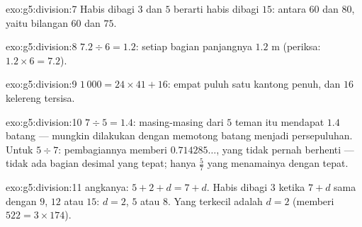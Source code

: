 \begin{solution}{exo:g5:division:7}
Habis dibagi $3$ dan $5$ berarti habis dibagi $15$: antara $60$ dan
$80$, yaitu bilangan $60$ dan $75$.
\end{solution}

\begin{solution}{exo:g5:division:8}
$7.2 \div 6 = 1.2$: setiap bagian panjangnya $1.2$ m (periksa:
$1.2 \times 6 = 7.2$).
\end{solution}

\begin{solution}{exo:g5:division:9}
$1\,000 = 24 \times 41 + 16$: empat puluh satu kantong penuh, dan
$16$ kelereng tersisa.
\end{solution}

\begin{solution}{exo:g5:division:10}
$7 \div 5 = 1.4$: masing-masing dari $5$ teman itu mendapat $1.4$
batang --- mungkin dilakukan dengan memotong batang menjadi
persepuluhan. Untuk $5 \div 7$: pembagiannya memberi $0.714285\dots$,
yang tidak pernah berhenti --- tidak ada bagian desimal yang tepat;
hanya  $\frac57$ yang menamainya dengan tepat.
\end{solution}

\begin{solution}{exo:g5:division:11}
 angkanya: $5 + 2 + d = 7 + d$. Habis dibagi $3$ ketika
$7 + d$ sama dengan $9$, $12$ atau $15$: $d = 2$, $5$ atau $8$. Yang
terkecil adalah $d = 2$ (memberi $522 = 3 \times 174$).

\end{solution}
